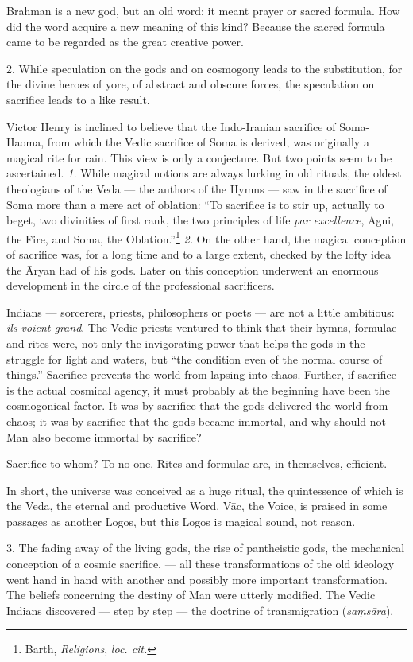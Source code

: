 \documentclass[a4paper, 11pt, oneside, english]{article}
\begin{document}
Brahman is a new god, but an old word: it meant prayer or sacred formula. How did the word acquire a new meaning of this kind? Because the sacred formula came to be regarded as the great creative power.

2. While speculation on the gods and on cosmogony leads to the substitution, for the divine heroes of yore, of abstract and obscure forces, the speculation on sacrifice leads to a like result.

Victor Henry is inclined to believe that the Indo-Iranian sacrifice of Soma-Haoma, from which the Vedic sacrifice of Soma is derived, was originally a magical rite for rain. This view is only a conjecture. But two points seem to be ascertained. \emph{1.} While magical notions are always lurking in old rituals, the oldest theologians of the Veda --- the authors of the Hymns --- saw in the sacrifice of Soma more than a mere act of oblation: ``To sacrifice is to stir up, actually to beget, two divinities of first rank, the two principles of life \emph{par excellence}, Agni, the Fire, and Soma, the Oblation.''\footnote{Barth, \emph{Religions}, \emph{loc. cit.}} \emph{2.} On the other hand, the magical conception of sacrifice was, for a long time and to a large extent, checked by the lofty idea the Āryan had of his gods. Later on this conception underwent an enormous development in the circle of the professional sacrificers.

Indians --- sorcerers, priests, philosophers or poets --- are not a little ambitious: \emph{ils voient grand}. The Vedic priests ventured to think that their hymns, formulae and rites were, not only the invigorating power that helps the gods in the struggle for light and waters, but ``the condition even of the normal course of things.'' Sacrifice prevents the world from lapsing into chaos. Further, if sacrifice is the actual cosmical agency, it must probably at the beginning have been the cosmogonical factor. It was by sacrifice that the gods delivered the world from chaos; it was by sacrifice that the gods became immortal, and why should not Man also become immortal by sacrifice?

Sacrifice to whom? To no one. Rites and formulae are, in themselves, efficient.

In short, the universe was conceived as a huge ritual, the quintessence of which is the Veda, the eternal and productive Word. Vāc, the Voice, is praised in some passages as another Logos, but this Logos is magical sound, not reason.

3. The fading away of the living gods, the rise of pantheistic gods, the mechanical conception of a cosmic sacrifice, --- all these transformations of the old ideology went hand in hand with another and possibly more important transformation. The beliefs concerning the destiny of Man were utterly modified. The Vedic Indians discovered --- step by step --- the doctrine of transmigration (\emph{saṃsāra}).
\end{document}

